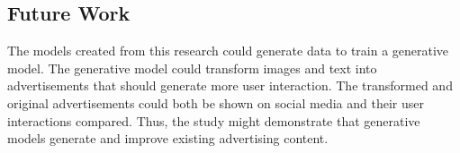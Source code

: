 \documentclass[mksc,blindrev]{informs3} %
\begin{document}
\subsection{Future Work}

The models created from this research could generate data to train a generative model. The generative model could transform images and text into advertisements that should generate more user interaction. The transformed and original advertisements could both be shown on social media and their user interactions compared. Thus, the study might demonstrate that generative models generate and improve existing advertising content.






%
%
%



\end{document}
